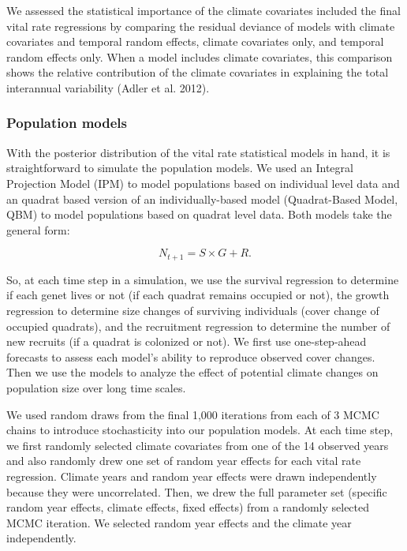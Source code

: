 \documentclass[12pt,]{article}
\begin{document}
We assessed the statistical importance of the climate covariates
included the final vital rate regressions by comparing the residual
deviance of models with climate covariates and temporal random effects,
climate covariates only, and temporal random effects only. When a model
includes climate covariates, this comparison shows the relative
contribution of the climate covariates in explaining the total
interannual variability (Adler et al. 2012).

\subsubsection{Population models}\label{population-models}

With the posterior distribution of the vital rate statistical models in
hand, it is straightforward to simulate the population models. We used
an Integral Projection Model (IPM) to model populations based on
individual level data and an quadrat based version of an
individually-based model (Quadrat-Based Model, QBM) to model populations
based on quadrat level data. Both models take the general form:

\begin{equation}
N_{t+1} = S \times G + R.
\end{equation}

So, at each time step in a simulation, we use the survival regression to
determine if each genet lives or not (if each quadrat remains occupied
or not), the growth regression to determine size changes of surviving
individuals (cover change of occupied quadrats), and the recruitment
regression to determine the number of new recruits (if a quadrat is
colonized or not). We first use one-step-ahead forecasts to assess each
model's ability to reproduce observed cover changes. Then we use the
models to analyze the effect of potential climate changes on population
size over long time scales.

We used random draws from the final 1,000 iterations from each of 3 MCMC
chains to introduce stochasticity into our population models. At each
time step, we first randomly selected climate covariates from one of the
14 observed years and also randomly drew one set of random year effects
for each vital rate regression. Climate years and random year effects
were drawn independently because they were uncorrelated. Then, we drew
the full parameter set (specific random year effects, climate effects,
fixed effects) from a randomly selected MCMC iteration. We selected
random year effects and the climate year independently.
\end{document}
